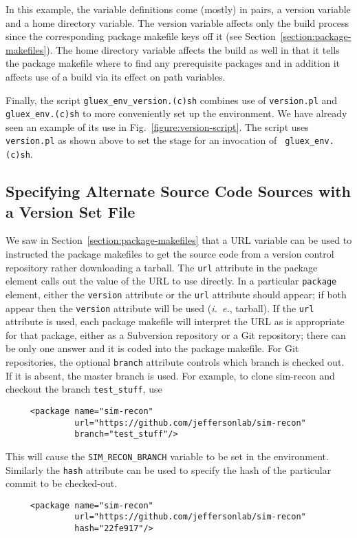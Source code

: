 \documentclass[12pt, letterpaper]{article}
\begin{document}
In this example, the variable definitions come (mostly) in pairs, a
version variable and a home directory variable. The version variable
affects only the build process since the corresponding package
makefile keys off it (see
Section~\ref{section:package-makefiles}). The home directory variable
affects the build as well in that it tells the package makefile where
to find any prerequisite packages and in addition it affects use of a
build via its effect on path variables.

Finally, the script {\tt gluex\_env\_version.(c)sh} combines use of
{\tt version.pl} and {\tt gluex\_env.(c)sh} to more conveniently set
up the environment. We have already seen an example of its use in
Fig.~\ref{figure:version-script}. The script uses {\tt version.pl} as
shown above to set the stage for an invocation of {\tt
  gluex\_env.(c)sh}.

\subsection{Specifying Alternate Source Code Sources with a Version Set File}

We saw in Section~\ref{section:package-makefiles} that a URL variable
can be used to instructed the package makefiles to get the source code
from a version control repository rather downloading a tarball. The
{\tt url} attribute in the package element calls out the value of the
URL to use directly. In a particular {\tt package} element, either the
{\tt version} attribute or the {\tt url} attribute should
appear; if both appear then the {\tt version} attribute will
be used ({\it i.~e.}, tarball).
If the {\tt url} attribute is used, each package makefile
will interpret the URL as is appropriate for that package, either as a
Subversion repository or a Git repository; there can be only one
answer and it is coded into the package makefile. For Git
repositories, the optional {\tt branch} attribute controls which
branch is checked out. If it is absent, the master branch is
used. For example, to clone sim-recon and checkout the branch
{\tt test\_stuff}, use
\begin{verbatim}
     <package name="sim-recon"
              url="https://github.com/jeffersonlab/sim-recon"
              branch="test_stuff"/>
\end{verbatim}
This will cause the {\tt SIM\_RECON\_BRANCH} variable to be set in
the environment. Similarly the {\tt hash} attribute can be used to
specify the hash of the particular commit to be checked-out.
\begin{verbatim}
     <package name="sim-recon"
              url="https://github.com/jeffersonlab/sim-recon"
              hash="22fe917"/>
\end{verbatim}
\end{document}
